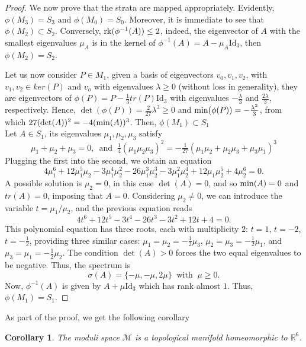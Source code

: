 \documentclass{article}
\numberwithin{equation}{section}
\newtheorem{corollary}[proposition]{Corollary}
\theoremstyle{definition}
\newcommand{\R}{\mathbb{R}}
\newcommand{\M}{\mathcal{M}}
\begin{document}
\begin{proof}
    \medskip

    We now prove that the strata are mapped appropriately. Evidently, $\phi(M_3)=S_3$ and $\phi(M_0)=S_0$. Moreover, it is immediate to see that $\phi(M_2)\subset S_2$. Conversely, ${\rm rk}(\phi^{-1}(A))\leq 2$, indeed, the eigenvector of $A$ with the smallest eigenvalues $\mu_A$ is in the kernel of $\phi^{-1}(A)=A-\mu_A\mathrm{Id}_3$, then $\phi(M_2)= S_2$.
    
    Let us now consider $P\in M_1$, given a basis of eigenvectors $v_0,v_1,v_2$, with $v_1,v_2\in{ ker}(P)$ and $v_o$ with eigenvalues $\lambda\geq 0$ (without loss in generality), they are eigenvectors of $\phi(P)=P-\frac{1}{3}tr(P)\mathrm{Id}_3$ with eigenvalues $-\frac{\lambda}{3}$ and $\frac{2\lambda}{3}$, respectively. Hence, $\det(\phi(P))=\frac{2}{27}\lambda^3\geq 0$ and ${\rm min}(\phi(P))=-\frac{\lambda^2}{3}$, from which $27(\det(A))^2=-4({\rm min}(A))^3$. Then, $\phi(M_1)\subset S_1$\\
    Let $A\in S_1$, its eigenvalues $\mu_1,\mu_2,\mu_3$ satisfy
    \begin{equation*}
        \mu_1+\mu_2+\mu_3=0,\,\text{ and }\ \tfrac{1}{4}(\mu_1\mu_2\mu_3)^2=-\tfrac{1}{27}(\mu_1\mu_2+\mu_2\mu_3+\mu_3\mu_1)^3
    \end{equation*}
    Plugging the first into the second, we obtain an equation
    \[4\mu_1^6+12\mu_1^5\mu_2-3\mu_1^4\mu_2^2-26\mu_1^3\mu_2^3-3\mu_1^2\mu_2^4+12\mu_1\mu_2^5+4\mu_2^6=0.\]
    A possible solution is $\mu_2=0$, in this case $\det(A)=0$, and so ${\rm min}(A)=0$ and $tr(A)=0$, imposing that $A=0$. Considering $\mu_2\neq 0$, we can introduce the variable $t=\mu_1/\mu_2$, and the previous equation reads
    \[4t^6+12t^5-3t^4-26t^3-3t^2+12t+4=0.\]
    This polynomial equation has three roots, each with multiplicity $2$: $t=1$, $t=-2$, $t=-\frac{1}{2}$, providing three similar cases: $\mu_1=\mu_2=-\frac{1}{2}\mu_3$, $\mu_2=\mu_3=-\frac{1}{2}\mu_1$, and $\mu_3=\mu_1=-\frac{1}{2}\mu_2$. The condition $\det(A)>0$ forces the two equal eigenvalues to be negative. Thus, the spectrum is 
    \[\sigma(A)=\{-\mu,-\mu,2\mu\}\ \text{ with }\ \mu\geq 0.\]
    Now, $\phi^{-1}(A)$ is given by $A+\mu\mathrm{Id}_3$ which has rank almost $1$. Thus, $\phi(M_1)=S_1$.
\end{proof}

As part of the proof, we get the following corollary
\begin{corollary}
    The moduli space $\M$ is a topological manifold homeomorphic to $\R^6$.
\end{corollary}
\end{document}
